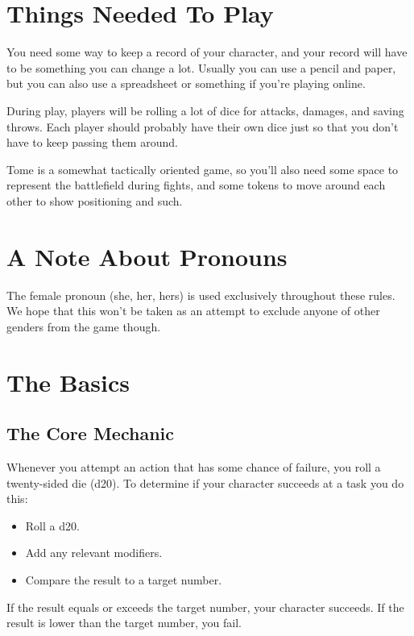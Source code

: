 \section{Things Needed To Play}

You need some way to keep a record of your character, and your record will have to be something you can change a lot. Usually you can use a pencil and paper, but you can also use a spreadsheet or something if you're playing online.

During play, players will be rolling a lot of dice for attacks, damages, and saving throws. Each player should probably have their own dice just so that you don't have to keep passing them around.

Tome is a somewhat tactically oriented game, so you'll also need some space to represent the battlefield during fights, and some tokens to move around each other to show positioning and such.

\section{A Note About Pronouns}

The female pronoun (she, her, hers) is used exclusively throughout these rules. We hope that this won't be taken as an attempt to exclude anyone of other genders from the game though.

\section{The Basics}

\subsection{The Core Mechanic}
Whenever you attempt an action that has some chance of failure, you roll a twenty-sided die (d20). To determine if your character succeeds at a task you do this:
\begin{itemize}
\item Roll a d20.
\item Add any relevant modifiers.
\item Compare the result to a target number.
\end{itemize}
If the result equals or exceeds the target number, your character succeeds. If the result is lower than the target number, you fail.

